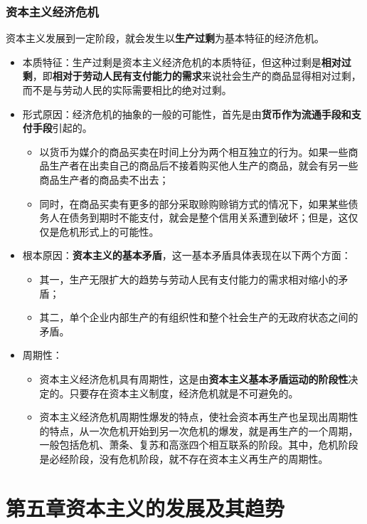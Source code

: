 \documentclass[12pt,openany]{ctexbook}
\begin{document}
\subsection{资本主义经济危机}
\begin{mdquote}
资本主义发展到一定阶段，就会发生以\textbf{生产过剩}为基本特征的经济危机。
\end{mdquote}
\begin{itemize}
  \item 本质特征：生产过剩是资本主义经济危机的本质特征，但这种过剩是\textbf{相对过剩}，即\textbf{相对于劳动人民有支付能力的需求}来说社会生产的商品显得相对过剩，而不是与劳动人民的实际需要相比的绝对过剩。
  \item 形式原因：经济危机的抽象的一般的可能性，首先是由\textbf{货币作为流通手段和支付手段}引起的。
\begin{itemize}
  \item 以货币为媒介的商品买卖在时间上分为两个相互独立的行为。如果一些商品生产者在出卖自己的商品后不接着购买他人生产的商品，就会有另一些商品生产者的商品卖不出去；
  \item 同时，在商品买卖有更多的部分采取赊购赊销方式的情况下，如果某些债务人在债务到期时不能支付，就会是整个信用关系遭到破坏；但是，这仅仅是危机形式上的可能性。
\end{itemize}
  \item 根本原因：\textbf{资本主义的基本矛盾}，这一基本矛盾具体表现在以下两个方面：
\begin{itemize}
  \item 其一，生产无限扩大的趋势与劳动人民有支付能力的需求相对缩小的矛盾；
  \item 其二，单个企业内部生产的有组织性和整个社会生产的无政府状态之间的矛盾。
\end{itemize}
  \item 周期性：
\begin{itemize}
  \item 资本主义经济危机具有周期性，这是由\textbf{资本主义基本矛盾运动的阶段性}决定的。只要存在资本主义制度，经济危机就是不可避免的。
  \item 资本主义经济危机周期性爆发的特点，使社会资本再生产也呈现出周期性的特点，从一次危机开始到另一次危机的爆发，就是再生产的一个周期，一般包括危机、萧条、复苏和高涨四个相互联系的阶段。其中，危机阶段是必经阶段，没有危机阶段，就不存在资本主义再生产的周期性。
\end{itemize}
\end{itemize}
\chapter{第五章\quad{}资本主义的发展及其趋势}
\end{document}

